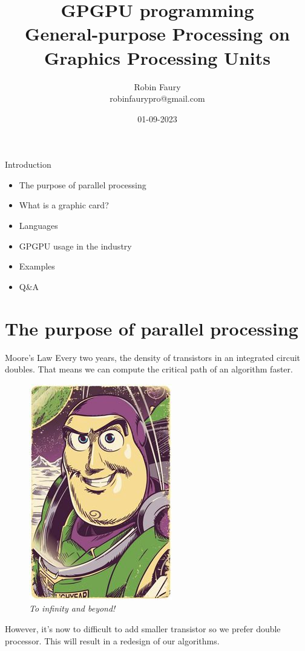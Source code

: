 \documentclass{beamer}
\title{GPGPU programming\\General-purpose Processing on Graphics Processing Units}
\author{Robin Faury\\robinfaurypro@gmail.com}
\date{01-09-2023}
\begin{document}
\begin{frame}
\titlepage
\end{frame}

\begin{frame}{Introduction}
	\begin{itemize}
		\item The purpose of parallel processing
		\item What is a graphic card?
		\item Languages
		\item GPGPU usage in the industry
		\item Examples
		\item Q\&A
	\end{itemize}
\end{frame}

\section{The purpose of parallel processing}
\begin{frame}{Moore's Law}
	Every two years, the density of transistors in an integrated circuit doubles. That means we can compute the critical path of an algorithm faster.
	\begin{figure}
		\includegraphics[scale=0.2]{figures/buzz1.jpg}
		\caption{\textit{To infinity and beyond!}}
	\end{figure}
	However, it's now to difficult to add smaller transistor so we prefer double processor. This will result in a redesign of our algorithms.
\end{frame}
\end{document}
